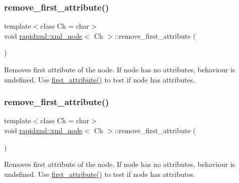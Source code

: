 \subsubsection{\texorpdfstring{remove\+\_\+first\+\_\+attribute()}{remove\_first\_attribute()}\hspace{0.1cm}{\footnotesize\ttfamily [1/2]}}
{\footnotesize\ttfamily template$<$class Ch = char$>$ \\
void \mbox{\hyperlink{classrapidxml_1_1xml__node}{rapidxml\+::xml\+\_\+node}}$<$ Ch $>$\+::remove\+\_\+first\+\_\+attribute (\begin{DoxyParamCaption}{ }\end{DoxyParamCaption})\hspace{0.3cm}{\ttfamily [inline]}}

Removes first attribute of the node. If node has no attributes, behaviour is undefined. Use \mbox{\hyperlink{classrapidxml_1_1xml__node_ab816ab6f13ee4b0588d5b76b0697511c}{first\+\_\+attribute()}} to test if node has attributes. \mbox{\label{classrapidxml_1_1xml__node_aa95192d2a165cca16c551ed2a2a06aec}} 
\subsubsection{\texorpdfstring{remove\+\_\+first\+\_\+attribute()}{remove\_first\_attribute()}\hspace{0.1cm}{\footnotesize\ttfamily [2/2]}}
{\footnotesize\ttfamily template$<$class Ch = char$>$ \\
void \mbox{\hyperlink{classrapidxml_1_1xml__node}{rapidxml\+::xml\+\_\+node}}$<$ Ch $>$\+::remove\+\_\+first\+\_\+attribute (\begin{DoxyParamCaption}{ }\end{DoxyParamCaption})\hspace{0.3cm}{\ttfamily [inline]}}

Removes first attribute of the node. If node has no attributes, behaviour is undefined. Use \mbox{\hyperlink{classrapidxml_1_1xml__node_ab816ab6f13ee4b0588d5b76b0697511c}{first\+\_\+attribute()}} to test if node has attributes. \mbox{\label{classrapidxml_1_1xml__node_a62bf7b276cf7a651a3337f5e0a0ef6ac}} 
